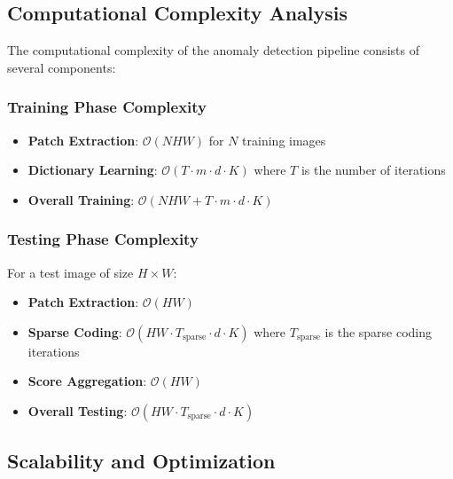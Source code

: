 \documentclass[12pt]{article}
\begin{document}
\subsection{Computational Complexity Analysis}
\label{subsec:complexity}

The computational complexity of the anomaly detection pipeline consists of several components:

\subsubsection{Training Phase Complexity}
\label{subsubsec:training_complexity}

\begin{itemize}[leftmargin=*]
    \item \textbf{Patch Extraction}: $\mathcal{O}(NHW)$ for $N$ training images
    \item \textbf{Dictionary Learning}: $\mathcal{O}(T \cdot m \cdot d \cdot K)$ where $T$ is the number of iterations
    \item \textbf{Overall Training}: $\mathcal{O}(NHW + T \cdot m \cdot d \cdot K)$
\end{itemize}

\subsubsection{Testing Phase Complexity}
\label{subsubsec:testing_complexity}

For a test image of size $H \times W$:

\begin{itemize}[leftmargin=*]
    \item \textbf{Patch Extraction}: $\mathcal{O}(HW)$
    \item \textbf{Sparse Coding}: $\mathcal{O}(HW \cdot T_{\text{sparse}} \cdot d \cdot K)$ where $T_{\text{sparse}}$ is the sparse coding iterations
    \item \textbf{Score Aggregation}: $\mathcal{O}(HW)$
    \item \textbf{Overall Testing}: $\mathcal{O}(HW \cdot T_{\text{sparse}} \cdot d \cdot K)$
\end{itemize}

\subsection{Scalability and Optimization}
\label{subsec:scalability}
\end{document}
